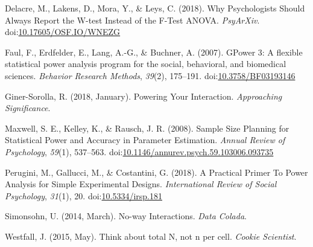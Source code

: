 \documentclass[,jou, draftfirst, a4paper,floatsintext]{apa6}
\begin{document}
\leavevmode\hypertarget{ref-delacre_why_2018}{}%
Delacre, M., Lakens, D., Mora, Y., \& Leys, C. (2018). Why Psychologists Should Always Report the W-test Instead of the F-Test ANOVA. \emph{PsyArXiv}. doi:\href{https://doi.org/10.17605/OSF.IO/WNEZG}{10.17605/OSF.IO/WNEZG}

\leavevmode\hypertarget{ref-faul_gpower_2007}{}%
Faul, F., Erdfelder, E., Lang, A.-G., \& Buchner, A. (2007). GPower 3: A flexible statistical power analysis program for the social, behavioral, and biomedical sciences. \emph{Behavior Research Methods}, \emph{39}(2), 175--191. doi:\href{https://doi.org/10.3758/BF03193146}{10.3758/BF03193146}

\leavevmode\hypertarget{ref-giner-sorolla_powering_2018}{}%
Giner-Sorolla, R. (2018, January). Powering Your Interaction. \emph{Approaching Significance}.

\leavevmode\hypertarget{ref-maxwell_sample_2008}{}%
Maxwell, S. E., Kelley, K., \& Rausch, J. R. (2008). Sample Size Planning for Statistical Power and Accuracy in Parameter Estimation. \emph{Annual Review of Psychology}, \emph{59}(1), 537--563. doi:\href{https://doi.org/10.1146/annurev.psych.59.103006.093735}{10.1146/annurev.psych.59.103006.093735}

\leavevmode\hypertarget{ref-perugini_practical_2018}{}%
Perugini, M., Gallucci, M., \& Costantini, G. (2018). A Practical Primer To Power Analysis for Simple Experimental Designs. \emph{International Review of Social Psychology}, \emph{31}(1), 20. doi:\href{https://doi.org/10.5334/irsp.181}{10.5334/irsp.181}

\leavevmode\hypertarget{ref-simonsohn_no-way_2014}{}%
Simonsohn, U. (2014, March). No-way Interactions. \emph{Data Colada}.

\leavevmode\hypertarget{ref-westfall_think_2015}{}%
Westfall, J. (2015, May). Think about total N, not n per cell. \emph{Cookie Scientist}.
\end{document}
